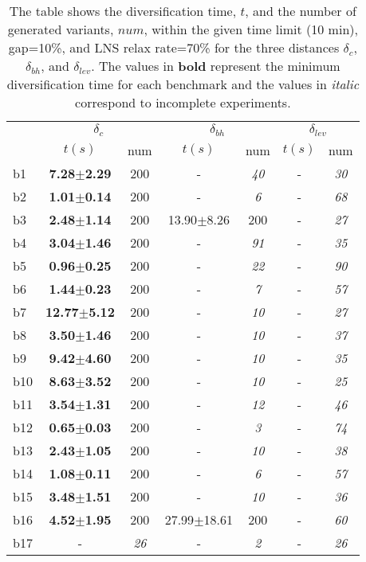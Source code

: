 \begin{longtable}{|l|c|c|c|c|c|c|}
\caption{\label{tab:distances}{The table shows 
		      the diversification time, $t$, and the number of generated
		      variants, $num$, within the given time limit (10 min), gap=10\%,
		      and \ac{LNS} relax rate=70\%
		      for the three distances $\delta_c$, $\delta_{bh}$,
		      and $\delta_{lev}$.
		      The values in  \textbf{bold} represent the minimum 
		      diversification time for each benchmark and the values in \emph{italic} 
		      correspond to incomplete experiments.}}\\
\hline
&\multicolumn{2}{c|}{$\delta_c$}&\multicolumn{2}{c|}{$\delta_{bh}$}&\multicolumn{2}{c|}{$\delta_{lev}$}\\
\cline{2-7}
&$t(s)$&num&$t(s)$&num&$t(s)$&num\\
\hline
b1&\textbf{7.28$\pm$2.29} & 200 &- & \textit{40 }&- & \textit{30 }
\\
b2&\textbf{1.01$\pm$0.14} & 200 &- & \textit{6 }&- & \textit{68 }
\\
b3&\textbf{2.48$\pm$1.14} & 200 &13.90$\pm$8.26 & 200 &- & \textit{27 }
\\
b4&\textbf{3.04$\pm$1.46} & 200 &- & \textit{91 }&- & \textit{35 }
\\
b5&\textbf{0.96$\pm$0.25} & 200 &- & \textit{22 }&- & \textit{90 }
\\
b6&\textbf{1.44$\pm$0.23} & 200 &- & \textit{7 }&- & \textit{57 }
\\
b7&\textbf{12.77$\pm$5.12} & 200 &- & \textit{10 }&- & \textit{27 }
\\
b8&\textbf{3.50$\pm$1.46} & 200 &- & \textit{10 }&- & \textit{37 }
\\
b9&\textbf{9.42$\pm$4.60} & 200 &- & \textit{10 }&- & \textit{35 }
\\
b10&\textbf{8.63$\pm$3.52} & 200 &- & \textit{10 }&- & \textit{25 }
\\
b11&\textbf{3.54$\pm$1.31} & 200 &- & \textit{12 }&- & \textit{46 }
\\
b12&\textbf{0.65$\pm$0.03} & 200 &- & \textit{3 }&- & \textit{74 }
\\
b13&\textbf{2.43$\pm$1.05} & 200 &- & \textit{10 }&- & \textit{38 }
\\
b14&\textbf{1.08$\pm$0.11} & 200 &- & \textit{6 }&- & \textit{57 }
\\
b15&\textbf{3.48$\pm$1.51} & 200 &- & \textit{10 }&- & \textit{36 }
\\
b16&\textbf{4.52$\pm$1.95} & 200 &27.99$\pm$18.61 & 200 &- & \textit{60 }
\\
b17&- & \textit{26 }&- & \textit{2 }&- & \textit{26 }
\\
\hline
\end{longtable}
